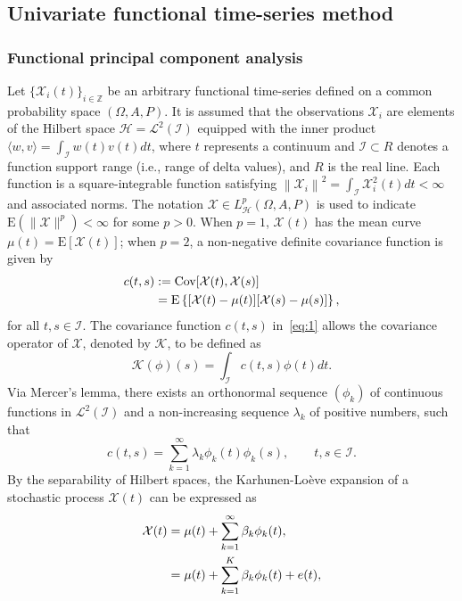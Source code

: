 \documentclass[12pt,a4paper]{article}
\newcommand{\X}{\mathcal{X}}
\begin{document}
\subsection{Univariate functional time-series method}\label{sec:3.1}

\subsubsection{Functional principal component analysis}\label{sec:fpca}

Let $\{\X_i(t)\}_{i\in \mathbb{Z}}$ be an arbitrary functional time-series defined on a common probability space $(\Omega, A, P)$. It is assumed that the observations $\X_i$ are elements of the Hilbert space $\mathcal{H} = \mathcal{L}^2(\mathcal{I})$ equipped with the inner product $\langle w, v\rangle = \int_{\mathcal{I}}w(t)v(t)dt$, where $t$ represents a continuum and $\mathcal{I}\subset R$ denotes a function support range (i.e., range of delta values), and $R$ is the real line. Each function is a square-integrable function satisfying $\left\|\X_i\right\|^2 = \int_{\mathcal{I}}\X_i^2(t)dt<\infty$ and associated norms. The notation $\X\in L_{\mathcal{H}}^p(\Omega, A, P)$ is used to indicate $\text{E}(\|\X\|^p)<\infty$ for some $p>0$. When $p=1$, $\X(t)$ has the mean curve $\mu(t) = \text{E}[\X(t)]$; when $p=2$, a non-negative definite covariance function is given by 
\begin{align}
c(t,s) &:= \text{Cov}[\X(t), \X(s)] \notag\\
&= \text{E}\left\{[\X(t) - \mu(t)][\X(s) - \mu(s)]\right\}, \label{eq:1}
\end{align}
for all $t, s\in \mathcal{I}$. The covariance function $c(t,s)$ in~\eqref{eq:1} allows the covariance operator of $\X$, denoted by $\mathcal{K}$, to be defined as
\begin{equation*}
\mathcal{K}(\phi)(s) = \int_{\mathcal{I}}c(t,s)\phi(t)dt.
\end{equation*}
Via Mercer's lemma, there exists an orthonormal sequence $(\phi_k)$ of continuous functions in $\mathcal{L}^2(\mathcal{I})$ and a non-increasing sequence $\lambda_k$ of positive numbers, such that
\begin{equation*}
c(t,s) = \sum_{k=1}^{\infty}\lambda_k \phi_k(t) \phi_k(s), \qquad t, s \in \mathcal{I}.
\end{equation*}
By the separability of Hilbert spaces, the Karhunen-Lo\`{e}ve expansion of a stochastic process $\X(t)$ can be expressed as
\begin{align}
\X(t) &= \mu(t) + \sum_{k=1}^{\infty}\beta_k\phi_k(t), \notag \\
&= \mu(t) + \sum^K_{k=1}\beta_{k}\phi_k(t) + e(t), \label{eq:2}
\end{align}
\end{document}
